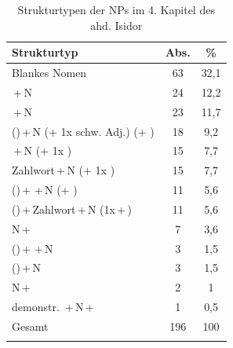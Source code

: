 \begin{table}
\centering
\caption{Strukturtypen der NPs im 4. Kapitel des ahd. Isidor \\ \parencite{Flick2018}}
\label{NP-Flick}
\begin{tabular}{lS[table-format=2.0]S[table-format=2.1]}
\lsptoprule
{Strukturtyp}                                   & {Abs.} & {\%}  \\ \midrule
Blankes Nomen                                          & 63            & 32,1         \\
\,+\,N                                    & 24            & 12,2         \\
\,+\,N                                          & 23            & 11,7         \\
 ()\,+\,N (+ 1x schw. Adj.) (+ ) & 18            & 9,2          \\
\,+\,N (+ 1x )                    & 15            & 7,7          \\
Zahlwort\,+\,N (+ 1x )                    & 15            & 7,7          \\
 ()\,+\,\,+\,N (+ )        & 11            & 5,6          \\
 ()\,+\,Zahlwort\,+\,N (1x\,+\,)     & 11            & 5,6          \\
N\,+\,                                    & 7             & 3,6          \\
 ()\,+\,\,+\,N                     & 3             & 1,5          \\
 ()\,+\,N                                     & 3             & 1,5          \\
N\,+\,                                          & 2             & 1            \\
demonstr. \,+\,N\,+\,                   & 1             & 0,5          \\\midrule
{Gesamt}                                        & {196}  & {100} \\ \lspbottomrule
\end{tabular}
\end{table}


